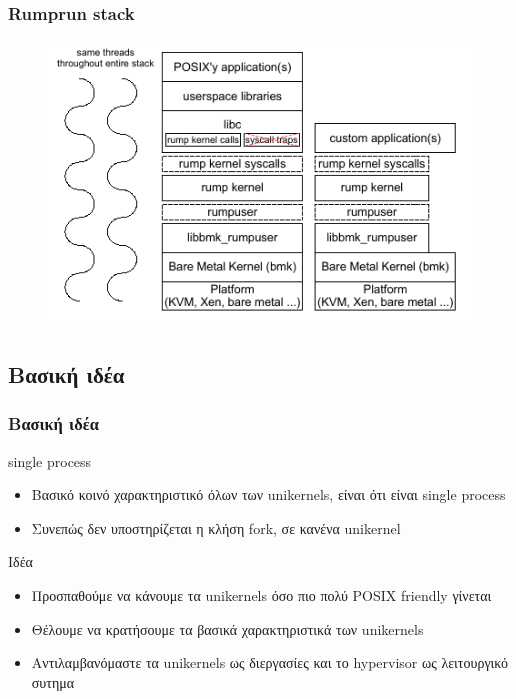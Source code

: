 \documentclass[red,slidestop,notes,compress,mathserif]{beamer}
\begin{document}
\begin{frame}
\frametitle{Rumprun stack}
\begin{figure}
\center
	\includegraphics[scale=0.5]{figures/rumprun_stack.png}
\end{figure}
\end{frame}

\subsection{Βασική ιδέα}
\begin{frame}
\frametitle{Βασική ιδέα}
\begin{block}{single process}
\begin{itemize}
\item Βασικό κοινό χαρακτηριστικό όλων των unikernels, είναι ότι είναι single process
\item Συνεπώς δεν υποστηρίζεται η κλήση fork, σε κανένα unikernel
\end{itemize}
\end{block}
\begin{block}{Ιδέα}
\begin{itemize}
\item Προσπαθούμε να κάνουμε τα unikernels όσο πιο πολύ POSIX friendly γίνεται
\item Θέλουμε να κρατήσουμε τα βασικά χαρακτηριστικά των unikernels
\item Αντιλαμβανόμαστε τα unikernels ως διεργασίες και το hypervisor ως λειτουργικό συτημα
\end{itemize}
\end{block}
\end{frame}
\end{document}
